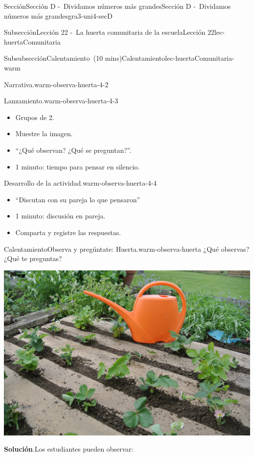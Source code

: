 \documentclass[oneside,10pt,]{article}
\newcommand{\blocktitlefont}{\relax}
\begin{document}
\begin{sectionptx}{Sección}{Sección D -~Dividamos números más grandes}{}{Sección D -~Dividamos números más grandes}{}{}{gra3-uni4-secD}
\begin{subsectionptx}{Subsección}{Lección 22 -~La huerta comunitaria de la escuela}{}{Lección 22}{}{}{lec-huertaComunitaria}
\begin{subsubsectionptx}{Subsubsección}{Calentamiento~(10 mins)}{}{Calentamiento}{}{}{lec-huertaComunitaria-warm}
\begin{paragraphs}{Narrativa.}{warm-observa-huerta-4-2}
\end{paragraphs}%
\begin{paragraphs}{Lanzamiento.}{warm-observa-huerta-4-3}%
%
\begin{itemize}[label=\textbullet]
\item{}Grupos de 2.%
\item{}Muestre la imagen.%
\item{}``¿Qué observan? ¿Qué se preguntan?''.%
\item{}1 minuto: tiempo para pensar en silencio.%
\end{itemize}
\end{paragraphs}%
\begin{paragraphs}{Desarrollo de la actividad.}{warm-observa-huerta-4-4}%
%
\begin{itemize}[label=\textbullet]
\item{}``Discutan con su pareja lo que pensaron''%
\item{}1 minuto: discusión en pareja.%
\item{}Comparta y registre las respuestas.%
\end{itemize}
\end{paragraphs}%
\begin{exploration}{Calentamiento}{Observa y pregúntate: Huerta.}{warm-observa-huerta}%
¿Qué observas?\\
 ¿Qué te preguntas?%
\begin{image}{0.125}{0.75}{0.125}{}%
\includegraphics[width=\linewidth]{external/jpg-source/3-4-D-22-warm-garden-934189_1920.jpg}
\end{image}%
\par\smallskip%
\noindent\textbf{\blocktitlefont Solución}.\hypertarget{warm-observa-huerta-3}{}\quad{}Los estudiantes pueden observar:%

\end{exploration}
\end{subsubsectionptx}
\end{subsectionptx}
\end{sectionptx}
\end{document}
